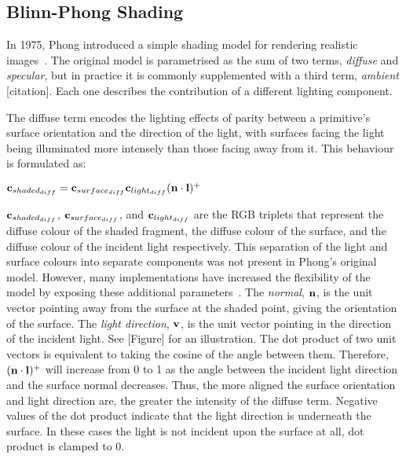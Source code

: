 \subsection{Blinn-Phong Shading}

In 1975, Phong introduced a simple shading model for rendering realistic images~\cite{PhongShading}. The original model is parametrised as the sum of two terms, \textit{diffuse} and \textit{specular}, but in practice it is commonly supplemented with a third term, \textit{ambient} [citation]. Each one describes the contribution of a different lighting component.

The diffuse term encodes the lighting effects of parity between a primitive's surface orientation and the direction of the light, with surfaces facing the light being illuminated more intensely than those facing away from it. This behaviour is formulated as:

\begin{center}
	\begin{math}\mathbf{c}_{shaded_{diff}} = \mathbf{c}_{surface_{diff}}\mathbf{c}_{light_{diff}}(\mathbf{n}\cdot\mathbf{l})^+\end{math}
\end{center}

\begin{math}\mathbf{c}_{shaded_{diff}}\end{math}, \begin{math}\mathbf{c}_{surface_{diff}}\end{math}, and \begin{math}\mathbf{c}_{light_{diff}}\end{math} are the RGB triplets that represent the diffuse colour of the shaded fragment, the diffuse colour of the surface, and the diffuse colour of the incident light respectively. This separation of the light and surface colours into separate components was not present in Phong's original model. However, many implementations have increased the flexibility of the model by exposing these additional parameters~\cite{LightingModelForComputerAnimators}. The \textit{normal}, \begin{math}\mathbf{n}\end{math}, is the unit vector pointing away from the surface at the shaded point, giving the orientation of the surface.  The \textit{light direction}, \begin{math}\mathbf{v}\end{math}, is the unit vector pointing in the direction of the incident light. See [Figure] for an illustration. The dot product of two unit vectors is equivalent to taking the cosine of the angle between them. Therefore, \begin{math}(\mathbf{n}\cdot\mathbf{l})^+\end{math} will increase from 0 to 1 as the angle between the incident light direction and the surface normal decreases. Thus, the more aligned the surface orientation and light direction are, the greater the intensity of the diffuse term. Negative values of the dot product indicate that the light direction is underneath the surface. In these cases the light is not incident upon the surface at all, dot product is clamped to 0.

